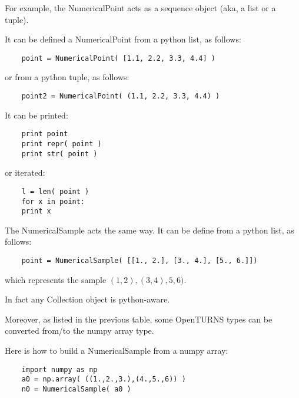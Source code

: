 For example, the NumericalPoint acts as a sequence object (aka, a list or a tuple).

It can be defined a NumericalPoint from a python list, as follows:
\begin{center}
  \begin{lstlisting}
    point = NumericalPoint( [1.1, 2.2, 3.3, 4.4] )
  \end{lstlisting}
\end{center}

or from a python tuple, as follows:
\begin{center}
  \begin{lstlisting}
    point2 = NumericalPoint( (1.1, 2.2, 3.3, 4.4) )
  \end{lstlisting}
\end{center}

It can be printed:
\begin{center}
  \begin{lstlisting}
    print point
    print repr( point )
    print str( point )
  \end{lstlisting}
\end{center}

or iterated:
\begin{center}
  \begin{lstlisting}
    l = len( point )
    for x in point:
    print x
  \end{lstlisting}
\end{center}

The NumericalSample acts the same way. It can be define from a python list, as follows:
\begin{center}
  \begin{lstlisting}
    point = NumericalSample( [[1., 2.], [3., 4.], [5., 6.]])
  \end{lstlisting}
\end{center}
which represents the sample $(1,2), (3,4), 5,6)$.


In fact any Collection object is python-aware.

Moreover, as listed in the previous table, some OpenTURNS types can be converted from/to the numpy array type.

Here is how to build a NumericalSample from a numpy array:
\begin{center}
  \begin{lstlisting}
    import numpy as np
    a0 = np.array( ((1.,2.,3.),(4.,5.,6)) )
    n0 = NumericalSample( a0 )
  \end{lstlisting}
\end{center}

